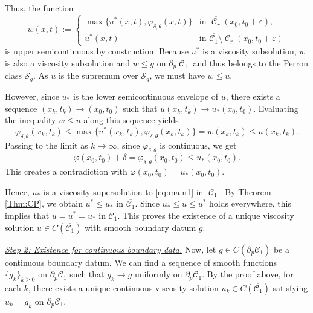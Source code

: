 \documentclass[12pt]{article}
\makeatletter
\newenvironment{customproof}[1]{%
  \par\pushQED{\qed}%
  \normalfont\topsep6pt \trivlist
  \item[\hskip\labelsep\itshape
    Proof of #1\@addpunct{.}]\ignorespaces
}{%
  \popQED\endtrivlist\@endpefalse
}
\numberwithin{Theorem}{section}
\theoremstyle{definition}
\theoremstyle{remark}
\numberwithin{equation}{section}
\DeclareMathOperator{\C}{\mathcal{C}}
\newcommand{\p}{\partial}
\newcommand{\eps}{\varepsilon}
\makeatother
\begin{document}
\begin{customproof}{Theorem \ref{thm:existence}}
Thus, the function
\[
w(x,t) := 
\begin{cases}
\max\{u^*(x,t), \varphi_{\delta,\theta}(x,t)\} & \text{in } \overline{\C_r}(x_0,t_0+\eps), \\
u^*(x,t) & \text{in } \overline{\mathcal{C}_1} \setminus \C_r(x_0,t_0+\eps)
\end{cases}
\]
is upper semicontinuous by construction. 
Because $u^*$ is a viscosity subsolution, $w$ is also a viscosity subsolution and $w\leq g$ on $\p_p \C_1$ and thus belongs to the Perron class $\mathcal{S}_g$. As $u$ is the supremum over $\mathcal{S}_g$, we must have $w \le u$.

However, since $u_*$ is the lower semicontinuous envelope of $u$, there exists a sequence $(x_k, t_k) \to (x_0,t_0)$ such that $u(x_k, t_k) \to u_*(x_0,t_0)$. Evaluating the inequality $w \le u$ along this sequence yields
\[
\varphi_{\delta,\theta}(x_k, t_k) \le \max\{u^*(x_k, t_k), \varphi_{\delta,\theta}(x_k, t_k)\} = w(x_k, t_k) \le u(x_k, t_k).
\]
Passing to the limit as $k \to \infty$, since $\varphi_{\delta,\theta}$ is continuous, we get
\[
\varphi(x_0,t_0) + \delta = \varphi_{\delta,\theta}(x_0, t_0) \le u_*(x_0, t_0).
\]
This creates a contradiction with $\varphi(x_0,t_0) = u_*(x_0,t_0)$.


Hence, $u_*$ is a viscosity supersolution to \eqref{eq:main1} in $\C_1$.
 By Theorem \ref{Thm:CP}, we obtain $u^* \le u_*$ in $\overline{\mathcal{C}_1}$. Since $u_* \le u \le u^*$ holds everywhere, this implies that $u = u^* = u_*$ in $\overline{\mathcal{C}_1}$. 
This proves the existence of a unique viscosity solution $u \in C(\overline{\mathcal{C}_1})$ with smooth boundary datum $g$.




\underline{\textit{Step 2: Existence for continuous boundary data.}}
Now, let $g \in C(\partial_p \mathcal{C}_1)$ be a continuous boundary datum. We can find a sequence of smooth functions $\{g_k\}_{k\geq 0}$ on $\partial_p \mathcal{C}_1$ such that $g_k \to g$ uniformly on $\partial_p \mathcal{C}_1$. 
By the proof above, for each $k$, there exists a unique continuous viscosity solution $u_k \in C(\overline{\mathcal{C}_1})$ satisfying $u_k = g_k$ on $\partial_p \mathcal{C}_1$.


\end{customproof}
\end{document}
